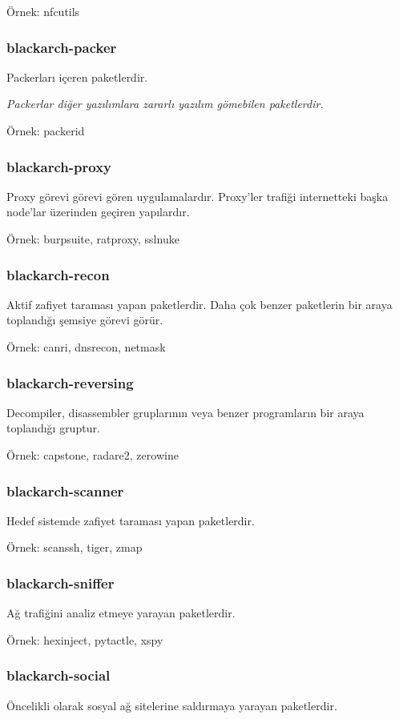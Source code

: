 \documentclass[a4paper, oneside, 11pt]{book}
\begin{document}
Örnek: nfcutils

\subsubsection{blackarch-packer}
Packerları içeren paketlerdir.

\textit{Packerlar diğer yazılımlara zararlı yazılım gömebilen paketlerdir.}

Örnek: packerid

\subsubsection{blackarch-proxy}
Proxy görevi görevi gören uygulamalardır. Proxy'ler trafiği internetteki başka node'lar üzerinden geçiren yapılardır.

Örnek: burpsuite, ratproxy, sslnuke

\subsubsection{blackarch-recon}
Aktif zafiyet taraması yapan paketlerdir. Daha çok benzer paketlerin bir araya toplandığı şemsiye görevi görür.

Örnek: canri, dnsrecon, netmask

\subsubsection{blackarch-reversing}
Decompiler, disassembler gruplarının veya benzer programların bir araya toplandığı gruptur.

Örnek: capstone, radare2, zerowine

\subsubsection{blackarch-scanner}
Hedef sistemde zafiyet taraması yapan paketlerdir.

Örnek: scanssh, tiger, zmap

\subsubsection{blackarch-sniffer}
Ağ trafiğini analiz etmeye yarayan paketlerdir.

Örnek: hexinject, pytactle, xspy

\subsubsection{blackarch-social}
Öncelikli olarak sosyal ağ sitelerine saldırmaya yarayan paketlerdir.
\end{document}
